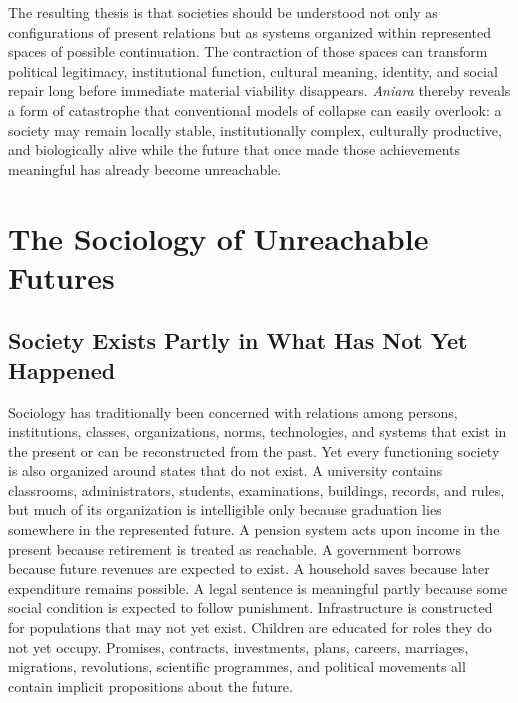\documentclass[11pt,oneside]{book}
\theoremstyle{definition}
\theoremstyle{remark}
\begin{document}
The resulting thesis is that societies should be understood not only as configurations of present relations but as systems organized within represented spaces of possible continuation. The contraction of those spaces can transform political legitimacy, institutional function, cultural meaning, identity, and social repair long before immediate material viability disappears. \emph{Aniara} thereby reveals a form of catastrophe that conventional models of collapse can easily overlook: a society may remain locally stable, institutionally complex, culturally productive, and biologically alive while the future that once made those achievements meaningful has already become unreachable.

\tableofcontents

\mainmatter

\chapter{The Sociology of Unreachable Futures}

\section{Society Exists Partly in What Has Not Yet Happened}

Sociology has traditionally been concerned with relations among persons, institutions, classes, organizations, norms, technologies, and systems that exist in the present or can be reconstructed from the past. Yet every functioning society is also organized around states that do not exist. A university contains classrooms, administrators, students, examinations, buildings, records, and rules, but much of its organization is intelligible only because graduation lies somewhere in the represented future. A pension system acts upon income in the present because retirement is treated as reachable. A government borrows because future revenues are expected to exist. A household saves because later expenditure remains possible. A legal sentence is meaningful partly because some social condition is expected to follow punishment. Infrastructure is constructed for populations that may not yet exist. Children are educated for roles they do not yet occupy. Promises, contracts, investments, plans, careers, marriages, migrations, revolutions, scientific programmes, and political movements all contain implicit propositions about the future.
\end{document}
